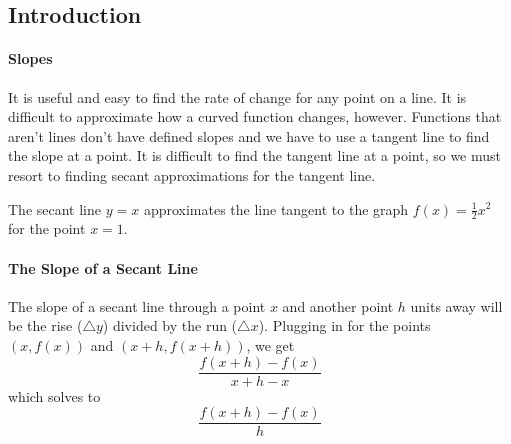\documentclass[../main.tex]{subfiles}
\begin{document}
\subsection{Introduction}
\paragraph{Slopes} It is useful and easy to find the rate of change for any point on a line. It is difficult to approximate how a curved function changes, however. Functions that aren't lines don't have defined slopes and we have to use a tangent line to find the slope at a point. It is difficult to find the tangent line at a point, so we must resort to finding secant approximations for the tangent line.
\begin{center}
\par The secant line $y=x$ approximates the line tangent to the graph $f(x)=\frac{1}{2} x^2$ for the point $x=1$.
\end{center}
\paragraph{The Slope of a Secant Line} The slope of a secant line through a point $x$ and another point $h$ units away will be the rise ($\triangle y$) divided by the run ($\triangle x$). Plugging in for the points $(x,f(x))$ and $(x+h,f(x+h))$, we get $$\frac{f(x+h)-f(x)}{x+h-x}$$which solves to$$\frac{f(x+h)-f(x)}{h}$$
\end{document}

